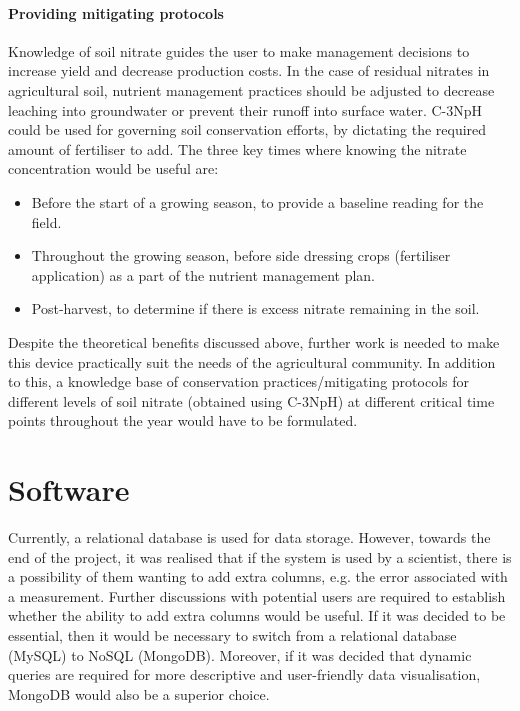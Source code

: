 \paragraph {Providing mitigating protocols}
Knowledge of soil nitrate guides the user to make management decisions to increase yield and decrease production costs. In the case of residual nitrates in agricultural soil, nutrient management practices should be adjusted to decrease leaching into groundwater or prevent their runoff into surface water. C-3NpH could be used for governing soil conservation efforts, by dictating the required amount of fertiliser to add. The three key times where knowing the nitrate concentration would be useful are:
\begin{itemize}
\item Before the start of a growing season, to provide a baseline reading for the field. 
\item Throughout the growing season, before side dressing crops (fertiliser application) as a part of the nutrient management plan. 
\item Post-harvest, to determine if there is excess nitrate remaining in the soil.
\end{itemize}

Despite the theoretical benefits discussed above, further work is needed to make this device practically suit the needs of the agricultural community. In addition to this, a knowledge base of conservation practices/mitigating protocols for different levels of soil nitrate (obtained using C-3NpH) at different critical time points throughout the year would have to be formulated.




\section{Software} \label{soft_future}
Currently, a relational database is used for data storage. However, towards the end of the project, it was realised that if the system is used by a scientist, there is a possibility of them wanting to add extra columns, e.g. the error associated with a measurement. Further discussions with potential users are required to establish whether the ability to add extra columns would be useful. If it was decided to be essential, then it would be necessary to switch from a relational database (MySQL) to NoSQL (MongoDB). Moreover, if it was decided that dynamic queries are required for more descriptive and user-friendly data visualisation, MongoDB would also be a superior choice.

